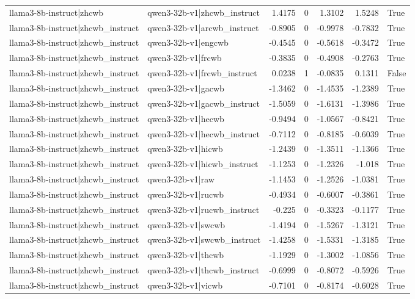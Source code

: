 \begin{table}
\begin{tabular}{l l r r r r l}
llama3-8b-instruct|zhcwb & qwen3-32b-v1|zhcwb_instruct & 1.4175 & 0 & 1.3102 & 1.5248 & True \\
llama3-8b-instruct|zhcwb_instruct & qwen3-32b-v1|arcwb_instruct & -0.8905 & 0 & -0.9978 & -0.7832 & True \\
llama3-8b-instruct|zhcwb_instruct & qwen3-32b-v1|engcwb & -0.4545 & 0 & -0.5618 & -0.3472 & True \\
llama3-8b-instruct|zhcwb_instruct & qwen3-32b-v1|frcwb & -0.3835 & 0 & -0.4908 & -0.2763 & True \\
llama3-8b-instruct|zhcwb_instruct & qwen3-32b-v1|frcwb_instruct & 0.0238 & 1 & -0.0835 & 0.1311 & False \\
llama3-8b-instruct|zhcwb_instruct & qwen3-32b-v1|gacwb & -1.3462 & 0 & -1.4535 & -1.2389 & True \\
llama3-8b-instruct|zhcwb_instruct & qwen3-32b-v1|gacwb_instruct & -1.5059 & 0 & -1.6131 & -1.3986 & True \\
llama3-8b-instruct|zhcwb_instruct & qwen3-32b-v1|hecwb & -0.9494 & 0 & -1.0567 & -0.8421 & True \\
llama3-8b-instruct|zhcwb_instruct & qwen3-32b-v1|hecwb_instruct & -0.7112 & 0 & -0.8185 & -0.6039 & True \\
llama3-8b-instruct|zhcwb_instruct & qwen3-32b-v1|hicwb & -1.2439 & 0 & -1.3511 & -1.1366 & True \\
llama3-8b-instruct|zhcwb_instruct & qwen3-32b-v1|hicwb_instruct & -1.1253 & 0 & -1.2326 & -1.018 & True \\
llama3-8b-instruct|zhcwb_instruct & qwen3-32b-v1|raw & -1.1453 & 0 & -1.2526 & -1.0381 & True \\
llama3-8b-instruct|zhcwb_instruct & qwen3-32b-v1|rucwb & -0.4934 & 0 & -0.6007 & -0.3861 & True \\
llama3-8b-instruct|zhcwb_instruct & qwen3-32b-v1|rucwb_instruct & -0.225 & 0 & -0.3323 & -0.1177 & True \\
llama3-8b-instruct|zhcwb_instruct & qwen3-32b-v1|swcwb & -1.4194 & 0 & -1.5267 & -1.3121 & True \\
llama3-8b-instruct|zhcwb_instruct & qwen3-32b-v1|swcwb_instruct & -1.4258 & 0 & -1.5331 & -1.3185 & True \\
llama3-8b-instruct|zhcwb_instruct & qwen3-32b-v1|thcwb & -1.1929 & 0 & -1.3002 & -1.0856 & True \\
llama3-8b-instruct|zhcwb_instruct & qwen3-32b-v1|thcwb_instruct & -0.6999 & 0 & -0.8072 & -0.5926 & True \\
llama3-8b-instruct|zhcwb_instruct & qwen3-32b-v1|vicwb & -0.7101 & 0 & -0.8174 & -0.6028 & True \\

\end{tabular}
\end{table}

